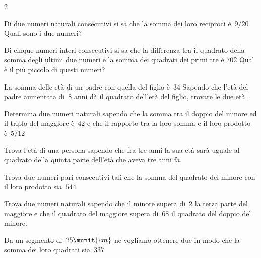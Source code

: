 \begin{htmulticols}{2}
\begin{esercizio}[*]
\label{ese:3.119}
Di due numeri naturali consecutivi si sa che la somma dei loro reciproci
è~\(9/20\) Quali sono i due numeri?
\end{esercizio}

\begin{esercizio}[*]
\label{ese:3.120}
Di cinque numeri interi consecutivi si sa che la differenza tra il quadrato
della somma degli ultimi due numeri e la somma dei quadrati dei primi tre è
\( 702\) Qual è il più piccolo di questi numeri?
\end{esercizio}

\begin{esercizio}[*]
\label{ese:3.121}
La somma delle età di un padre con quella del figlio è~\(34\) Sapendo che
l'età del padre aumentata di~\(8\) anni dà il quadrato dell'età del figlio,
trovare le due età.
\end{esercizio}

\begin{esercizio}[*]
\label{ese:3.122}
Determina due numeri naturali sapendo che la somma tra il doppio del minore
ed il triplo del maggiore è~\(42\) e che il rapporto tra la loro somma e il 
loro
prodotto è~\(5/12\)
\end{esercizio}

\begin{esercizio}[*]
\label{ese:3.123}
Trova l'età di una persona sapendo che fra tre anni la sua età sarà
uguale al quadrato della quinta parte dell'età che aveva tre anni fa.
\end{esercizio}

\begin{esercizio}[*]
\label{ese:3.124}
Trova due numeri pari consecutivi tali che la somma del quadrato del minore
con il loro prodotto sia~\(544\)
\end{esercizio}

\begin{esercizio}[*]
\label{ese:3.125}
Trova due numeri naturali sapendo che il minore supera di~\(2\) la terza 
parte del maggiore e che il quadrato del maggiore supera di~\(68\) il 
quadrato del doppio del minore.
\end{esercizio}

\begin{esercizio}[*]
\label{ese:3.126}
Da un segmento di~\(25\munit{cm}\) ne vogliamo ottenere due in modo che la 
somma dei loro quadrati sia~\(337\)
\end{esercizio}


\end{htmulticols}
